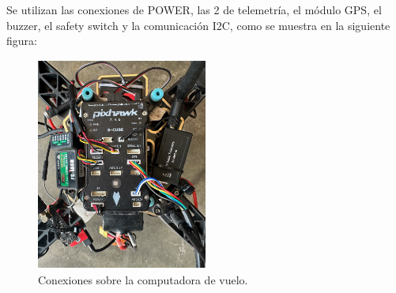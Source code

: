 \noindent Se utilizan las conexiones de POWER, las 2 de telemetría, el módulo GPS, el buzzer, el safety switch y la comunicación I2C, como se muestra en la siguiente figura:
\begin{figure}[H]
    \centering
    \includegraphics[width=0.5\textwidth, height=7cm]{imagenes/pix.jpeg}
    \caption{Conexiones sobre la computadora de vuelo.}
    \label{fig:basetren}
\end{figure}

